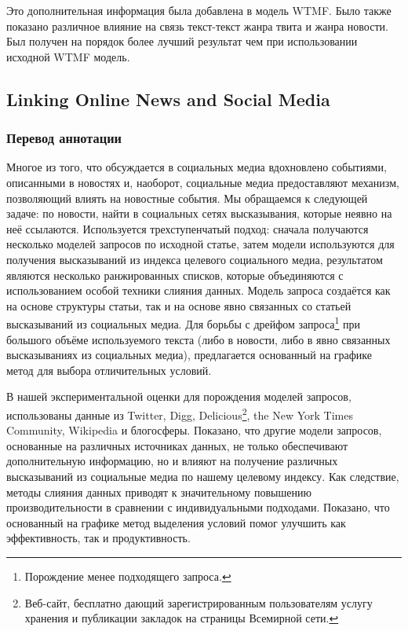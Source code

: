 \documentclass[14pt,a4paper,oneside]{extarticle}
\begin{document}
        Это дополнительная информация была добавлена в модель WTMF. Было также показано различное влияние на связь текст-текст жанра твита и жанра новости. Был получен на порядок более лучший результат чем при использовании исходной WTMF модель.

    \subsection{Linking Online News and Social Media}
        \subsubsection{Перевод аннотации}
            Многое из того, что обсуждается в социальных медиа вдохновлено событиями, описанными в новостях и, наоборот, социальные медиа предоставляют механизм, позволяющий влиять на новостные события.
            Мы обращаемся к следующей задаче: по новости, найти в социальных сетях высказывания, которые неявно на неё ссылаются.
            Используется трехступенчатый подход: сначала получаются несколько моделей запросов по исходной статье, затем модели используются для получения высказываний из индекса целевого социального медиа, результатом являются несколько ранжированных списков, которые объединяются с использованием особой техники слияния данных.
            Модель запроса создаётся как на основе структуры статьи, так и на основе явно связанных со статьей высказываний из социальных медиа.
            Для борьбы с дрейфом запроса\footnote{Порождение менее подходящего запроса.} при большого объёме используемого текста (либо в новости, либо в явно связанных высказываниях из социальных медиа), предлагается основанный на графике метод для выбора отличительных условий.

            В нашей экспериментальной оценки для порождения моделей запросов, использованы данные из Twitter, Digg, Delicious\footnote{Веб-сайт, бесплатно дающий зарегистрированным пользователям услугу хранения и публикации закладок на страницы Всемирной сети.}, the New York Times Community, Wikipedia и блогосферы.
            Показано, что другие модели запросов, основанные на различных источниках данных, не только обеспечивают дополнительную информацию, но и влияют на получение различных высказываний из социальные медиа по нашему целевому индексу.
            Как следствие, методы слияния данных приводят к значительному повышению производительности в сравнении с индивидуальными подходами.
            Показано, что основанный на графике метод выделения условий помог улучшить как эффективность, так и продуктивность.
\end{document}
